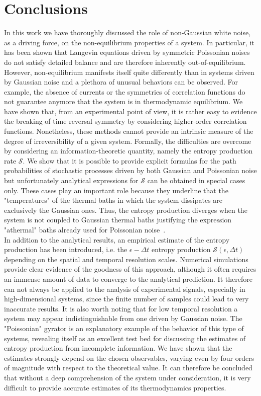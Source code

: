 \documentclass[12pt]{iopart}
\newcommand{\eps} {\epsilon}
\newcommand{\cS} {\mathcal{S}}
\begin{document}
\section{Conclusions}
In this work we have thoroughly discussed the role of non-Gaussian white noise, as a driving force, on the non-equilibrium properties of a system. In particular, it has been shown that Langevin equations driven by symmetric Poissonian noises do not satisfy detailed balance and are therefore inherently out-of-equilibrium. However, non-equilibrium manifests itself quite differently than in systems driven by Gaussian noise and a plethora of unusual behaviors can be observed. For example, the absence of currents or the symmetries of correlation functions do not guarantee anymore that the system is in thermodynamic equilibrium. We have shown that, from an experimental point of view, it is rather easy to evidence the breaking of time reversal symmetry by considering higher-order correlation functions. Nonetheless, these \textcolor{black}{methods} cannot provide an intrinsic measure of the degree of irreversibility of a given system. Formally, the difficulties are overcome by considering an information-theoretic quantity, namely the entropy production \textcolor{black}{rate} $\cS$. We show that it is possible to provide explicit \textcolor{black}{formulas} for the path probabilities of stochastic processes driven by both Gaussian and Poissonian noise but unfortunately analytical expressions for $\cS$ can be obtained in special cases only. These cases play an important role because they underline that the "temperatures" of the thermal baths in which the system dissipates are exclusively the Gaussian ones. Thus, the entropy production diverges when the system is not coupled to Gaussian thermal baths justifying the expression "athermal" baths already used for Poissonian noise~\cite{kanazawa2015minimal,kanazawa2017statistical}. \\
In addition to the analytical results, an empirical estimate of the entropy production has  been introduced, i.e. the $\epsilon-\Delta t$ entropy production $\cS(\eps,\Delta t)$ depending on the spatial and temporal resolution scales. Numerical simulations provide clear evidence of the goodness of this approach, although it often requires an immense amount of data to converge to the analytical prediction. It therefore can not always be applied to the analysis of experimental signals, especially in high-dimensional systems, since the finite number of samples could lead to very inaccurate results. It is also worth noting that for low temporal resolution a system may appear indistinguishable from one driven by Gaussian noise. The "Poissonian" gyrator is an explanatory example of the behavior of this type of systems, revealing itself as an excellent test bed for discussing the estimates of entropy production from incomplete information. We have shown that the estimates strongly depend on the chosen observables, varying even by four orders of magnitude with respect to the theoretical value. It can therefore be concluded that without a deep comprehension of the system under consideration, it is very difficult to provide accurate estimates of its thermodynamics properties.
\end{document}
